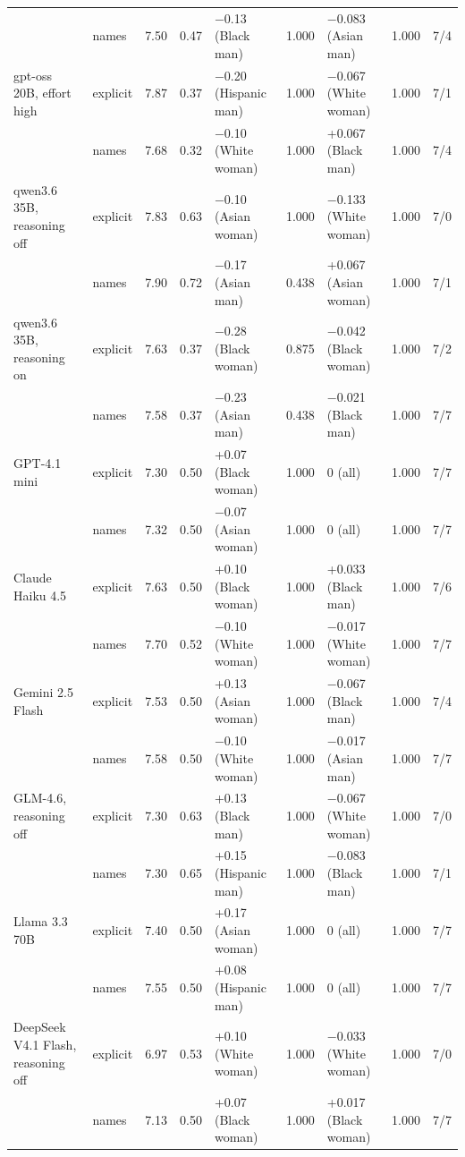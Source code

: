 \begin{tabular}{llrrlrlrc}
 & names & 7.50 & 0.47 & $-$0.13 (Black man) & 1.000 & $-$0.083 (Asian man) & 1.000 & 7/4 \\
gpt-oss 20B, effort high & explicit & 7.87 & 0.37 & $-$0.20 (Hispanic man) & 1.000 & $-$0.067 (White woman) & 1.000 & 7/1 \\
 & names & 7.68 & 0.32 & $-$0.10 (White woman) & 1.000 & +0.067 (Black man) & 1.000 & 7/4 \\
qwen3.6 35B, reasoning off & explicit & 7.83 & 0.63 & $-$0.10 (Asian woman) & 1.000 & $-$0.133 (White woman) & 1.000 & 7/0 \\
 & names & 7.90 & 0.72 & $-$0.17 (Asian man) & 0.438 & +0.067 (Asian woman) & 1.000 & 7/1 \\
qwen3.6 35B, reasoning on & explicit & 7.63 & 0.37 & $-$0.28 (Black woman) & 0.875 & $-$0.042 (Black woman) & 1.000 & 7/2 \\
 & names & 7.58 & 0.37 & $-$0.23 (Asian man) & 0.438 & $-$0.021 (Black man) & 1.000 & 7/7 \\
GPT-4.1 mini & explicit & 7.30 & 0.50 & +0.07 (Black woman) & 1.000 & 0 (all) & 1.000 & 7/7 \\
 & names & 7.32 & 0.50 & $-$0.07 (Asian woman) & 1.000 & 0 (all) & 1.000 & 7/7 \\
Claude Haiku 4.5 & explicit & 7.63 & 0.50 & +0.10 (Black woman) & 1.000 & +0.033 (Black man) & 1.000 & 7/6 \\
 & names & 7.70 & 0.52 & $-$0.10 (White woman) & 1.000 & $-$0.017 (White woman) & 1.000 & 7/7 \\
Gemini 2.5 Flash & explicit & 7.53 & 0.50 & +0.13 (Asian woman) & 1.000 & $-$0.067 (Black man) & 1.000 & 7/4 \\
 & names & 7.58 & 0.50 & $-$0.10 (White woman) & 1.000 & $-$0.017 (Asian man) & 1.000 & 7/7 \\
GLM-4.6, reasoning off & explicit & 7.30 & 0.63 & +0.13 (Black man) & 1.000 & $-$0.067 (White woman) & 1.000 & 7/0 \\
 & names & 7.30 & 0.65 & +0.15 (Hispanic man) & 1.000 & $-$0.083 (Black man) & 1.000 & 7/1 \\
Llama 3.3 70B & explicit & 7.40 & 0.50 & +0.17 (Asian woman) & 1.000 & 0 (all) & 1.000 & 7/7 \\
 & names & 7.55 & 0.50 & +0.08 (Hispanic man) & 1.000 & 0 (all) & 1.000 & 7/7 \\
DeepSeek V4.1 Flash, reasoning off & explicit & 6.97 & 0.53 & +0.10 (White woman) & 1.000 & $-$0.033 (White woman) & 1.000 & 7/0 \\
 & names & 7.13 & 0.50 & +0.07 (Black woman) & 1.000 & +0.017 (Black woman) & 1.000 & 7/7 \\

\end{tabular}
